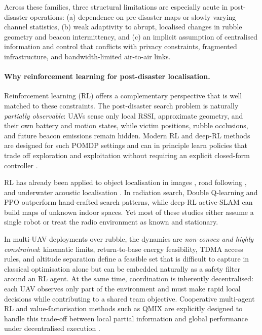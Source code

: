 \documentclass[drones,article,accept,pdftex,moreauthors]{Definitions/mdpi}
\begin{document}
Across these families, three structural limitations are especially acute in post-disaster operations:
(a) dependence on pre-disaster maps or slowly varying channel statistics,
(b) weak adaptivity to abrupt, localised changes in rubble geometry and beacon intermittency, and
(c) an implicit assumption of centralised information and control that conflicts with privacy constraints, fragmented infrastructure, and bandwidth-limited air-to-air links.

\paragraph{Why reinforcement learning for post-disaster localisation.}
Reinforcement learning (RL) offers a complementary perspective that is well matched to these constraints. The post-disaster search problem is naturally \emph{partially observable}: UAVs sense only local RSSI, approximate geometry, and their own battery and motion states, while victim positions, rubble occlusions, and future beacon emissions remain hidden. Modern RL and deep-RL methods are designed for such POMDP settings and can in principle learn policies that trade off exploration and exploitation without requiring an explicit closed-form controller
\citep{suttonReinforcementLearningIntroduction1998,ayodeleIntroductionMachineLearning2010}.

RL has already been applied to object localisation in images
\citep{caicedoActiveObjectLocalization2015,wangMultitaskLearningObject2019},
road following
\citep{zhaoDeepReinforcementLearning2020},
and underwater acoustic localisation
\citep{rauchensteinImprovingUnderwaterLocalization2018}.
In radiation search, Double Q-learning
\citep{liuDoubleQLearningRadiation2019}
and PPO
\citep{proctorProximalPolicyOptimization2021}
outperform hand-crafted search patterns, while deep-RL active-SLAM
\citep{placedDeepReinforcementLearning2020,grandoDoubleCriticDeep2021}
can build maps of unknown indoor spaces. Yet most of these studies either assume a single robot or treat the radio environment as known and stationary.

In multi-UAV deployments over rubble, the dynamics are \emph{non-convex and highly constrained}: kinematic limits, return-to-base energy feasibility, TDMA access rules, and altitude separation define a feasible set that is difficult to capture in classical optimisation alone but can be embedded naturally as a safety filter around an RL agent. At the same time, coordination is inherently decentralised: each UAV observes only part of the environment and must make rapid local decisions while contributing to a shared team objective. Cooperative multi-agent RL and value-factorisation methods such as QMIX are explicitly designed to handle this trade-off between local partial information and global performance under decentralised execution
\citep{jungMaplessNavigationLearning2021,chunxueUAVAutonomousTarget2019,zhuMARLCommSurvey2024,ningMARLSurvey2024}.
\end{document}
